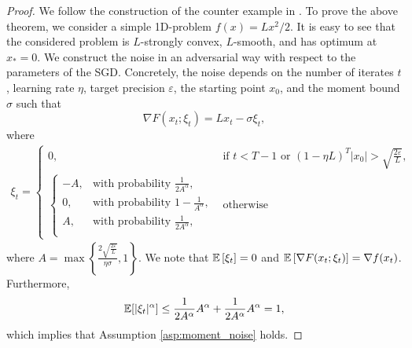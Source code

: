 \documentclass{article} %
\numberwithin{equation}{section}
\begin{document}
\begin{proof}
    We follow the construction of the counter example in \cite{pmlr-v202-sadiev23a}. 
    To prove the above theorem, we consider a simple 1D-problem $f(x) = L x^2/2$. 
    It is easy to see that the considered problem is $L$-strongly convex, $L$-smooth, and has optimum at $x_* = 0$. 
    We construct the noise in an adversarial way with respect to the parameters of the SGD. 
    Concretely, the noise depends on the number of iterates $t$, learning rate $\eta$, target precision $\varepsilon$, the starting point $x_0$, and the moment bound $\sigma$ such that 
    \begin{equation}
        \nabla F(x_t;\xi_t) = L x_t - \sigma \xi_t, 
    \end{equation}
    where 
    \begin{align}\label{app:eq:sgd_noise}
        \xi_t = 
        \begin{cases}
            0, & \text{if } t < T-1 \text{ or } (1 - \eta L)^T |x_0| > \sqrt{\frac{2\varepsilon}{L}} ,\\ 
            \begin{cases}
                - A,  & \text{with probability } \frac{1}{2A^\alpha}, \\
                0, & \text{with probability } 1 - \frac{1}{A^\alpha},\\
                A,  & \text{with probability } \frac{1}{2A^\alpha}, \\
            \end{cases}
            &\text{otherwise}
        \end{cases}
    \end{align}
    where $A = \max\left\{\frac{2\sqrt{\frac{2\varepsilon}{L}}}{\eta \sigma}, 1\right\}$. 
    We note that $\mathbb{E}\left[\xi_t\right] = 0$ and $\mathbb{E}\left[\nabla F(x_t;\xi_t)\right]  = \nabla f (x_t)$. 
    Furthermore, 
    \begin{equation}
        \mathbb{E} [|\xi_t|^\alpha] \leq \frac{1}{2A^\alpha}  A^\alpha + \frac{1}{2A^\alpha}  A^\alpha = 1, 
    \end{equation}
    which implies that Assumption \ref{asp:moment_noise} holds. 


\end{proof}
\end{document}
